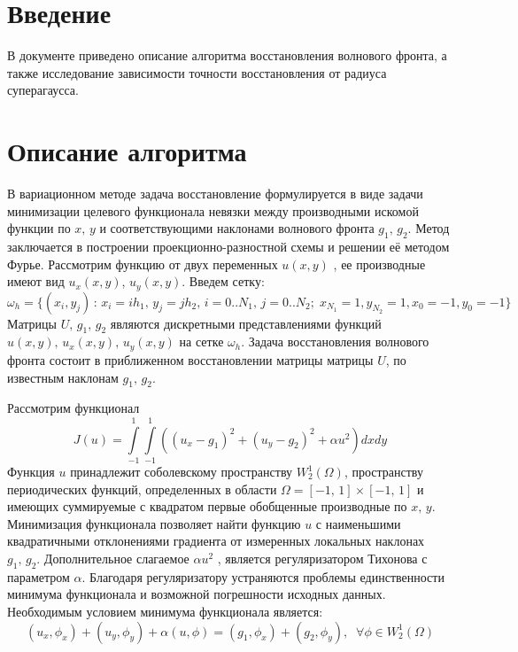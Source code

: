 \documentclass[oneside, final, 14pt]{article}
\begin{document}
\tableofcontents





\newpage
\section*{Введение}
В документе приведено описание алгоритма восстановления волнового фронта, а также исследование зависимости точности восстановления от 
радиуса суперагаусса.

\newpage
\section{Описание алгоритма}
В вариационном методе задача восстановление формулируется в виде задачи минимизации целевого функционала невязки между производными 
искомой функции по $x,\,y$ и соответствующими наклонами волнового фронта $g_1,\, g_2$. Метод заключается в построении проекционно-разностной 
схемы и решении её методом Фурье. Рассмотрим функцию от двух переменных $u(x,y)$ , ее производные имеют вид $u_x(x,y)$, $u_y(x,y)$.
Введем сетку: 
\begin{equation}
\omega_h = \{(x_i, y_j) \,:\, x_i = ih_1,\,y_j = jh_2,\, i = 0..N_1,\, j = 0..N_2;\; x_{N_1} = 1, y_{N_2} = 1, x_0 = -1, y_0 = -1\}
\end{equation}
Матрицы $U,\, g_1,\, g_2$ являются дискретными представлениями функций $u(x,y) ,\, u_x(x,y) ,\, u_y(x,y)$ на сетке $\omega_h$. Задача восстановления волнового фронта состоит в приближенном восстановлении матрицы матрицы $U$, по известным наклонам $g_1,\, g_2$.

Рассмотрим функционал $$J(u) = \int \limits_{-1}^{1} \int \limits_{-1}^{1} ((u_x - g_1)^2 + (u_y-g_2)^2 + \alpha u^2 )dxdy$$
Функция $u$ принадлежит соболевскому пространству $W_{2}^{1}(\Omega)$, пространству периодических функций, определенных в области $\Omega = [-1,\,1]  \times [-1,\,1]$ и имеющих суммируемые с квадратом первые обобщенные производные по $x,\,y$. Минимизация функционала позволяет найти функцию $u$ с наименьшими квадратичными отклонениями градиента от измеренных локальных наклонах $g_1,\, g_2$. Дополнительное слагаемое $\alpha u^2$ , является регуляризатором Тихонова с параметром $\alpha$. Благодаря регуляризатору устраняются проблемы единственности минимума функционала и возможной погрешности исходных данных. Необходимым условием минимума функционала является:
\begin{equation}\label{nessasary condition}
(u_x, \phi_x) + (u_y,\phi_y) + \alpha(u, \phi) = (g_1, \phi_x) + (g_2, \phi_y),\;\;\forall\phi \in W_{2}^{1}(\Omega)
\end{equation}
\end{document}
